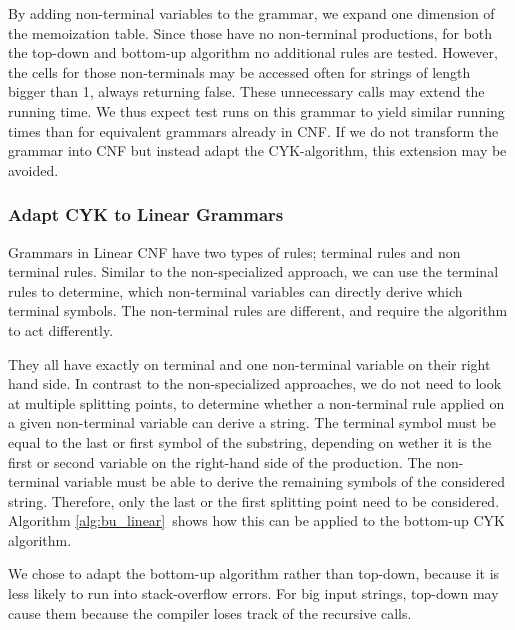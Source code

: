 By adding non-terminal variables to the grammar, we expand one dimension of the memoization table.
Since those have no non-terminal productions, for both the top-down and bottom-up algorithm no additional rules are tested.
However, the cells for those non-terminals may be accessed often for strings of length bigger than 1, always returning false.
These unnecessary calls may extend the running time.
We thus expect test runs on this grammar to yield similar running times than for equivalent grammars already in CNF.
If we do not transform the grammar into CNF but instead adapt the CYK-algorithm, this extension may be avoided.

\subsubsection{Adapt CYK to Linear Grammars}
Grammars in Linear CNF have two types of rules; terminal rules and non terminal rules.
Similar to the non-specialized approach, we can use the terminal rules to determine, which non-terminal variables can directly derive which terminal symbols.
The non-terminal rules are different, and require the algorithm to act differently.

They all have exactly on terminal and one non-terminal variable on their right hand side.
In contrast to the non-specialized approaches, we do not need to look at multiple splitting points, to determine whether a non-terminal rule applied on a given non-terminal variable can derive a string.
The terminal symbol must be equal to the last or first symbol of the substring, depending on wether it is the first or second variable on the right-hand side of the production.
The non-terminal variable must be able to derive the remaining symbols of the considered string.
Therefore, only the last or the first splitting point need to be considered.
Algorithm \ref{alg:bu_linear}~shows how this can be applied to the bottom-up CYK algorithm.

We chose to adapt the bottom-up algorithm rather than top-down, because it is less likely to run into stack-overflow errors.
For big input strings, top-down may cause them because the compiler loses track of the recursive calls.

